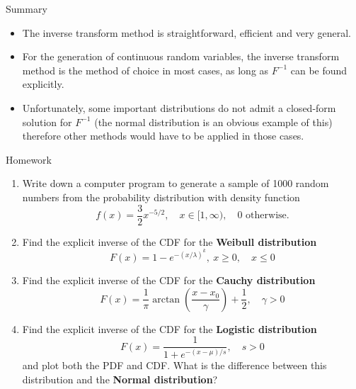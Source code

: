 \documentclass[8pt]{beamer}
\begin{document}
\begin{frame}{Summary}
\begin{itemize}
	\item The inverse transform method is straightforward, efficient and very general.
	\item For the generation of continuous random variables, the inverse transform method is the method of choice in most cases, as long as $F^{-1}$ can be found explicitly.
	\item Unfortunately, some important distributions do not admit a closed-form solution for $F^{-1}$ (the normal distribution is an obvious example of this) therefore other methods would have to be applied in those cases.

\end{itemize}
\end{frame}

\begin{frame}{Homework}
\begin{enumerate}
	\item Write down a computer program to generate a sample of 1000 random numbers from the probability distribution with density function 
\begin{equation*}
f(x) = \frac{3}{2} x^{-5/2}, \quad x \in [1, \infty), \quad 0 \text{ otherwise.}
\end{equation*}
	\item Find the explicit inverse of the CDF for the \textbf{Weibull distribution} $$F(x) = 1 - e^{-(x/\lambda)^k}, \ x \ge 0, \quad x \leq 0$$
	\item Find the explicit inverse of the CDF for the \textbf{Cauchy distribution} $$F(x) = \frac{1}{\pi} \arctan\left(\frac{x-x_0}{\gamma}\right) + \frac{1}{2}, \quad \gamma>0$$ 
	\item Find the explicit inverse of the CDF for the \textbf{Logistic distribution} $$F(x) = \frac{1}{1 + e^{-(x-\mu)/s}}, \quad s > 0$$ and plot both the PDF and CDF. What is the difference between this distribution and the \textbf{Normal distribution}?
\end{enumerate}
\end{frame}
\end{document}
